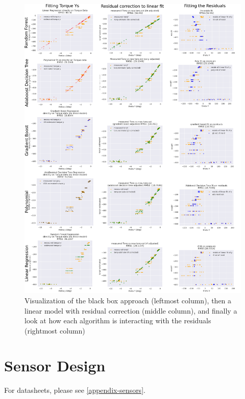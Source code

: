 \documentclass[preprint,12pt,3p]{elsarticle}
\begin{document}
\begin{figure}[p!]
\centering
\includegraphics[width=\textwidth]{images/residcorrect/layout_vertical.png}
\caption{Visualization of the black box approach (leftmost column), then a linear model with
residual correction (middle column), and finally a look at how each algorithm is interacting with
the residuals (rightmost column)}
\label{fig:residfit}
\end{figure}


\section{Sensor Design}

For datasheets, please see \ref{appendix-sensors}.
\end{document}
